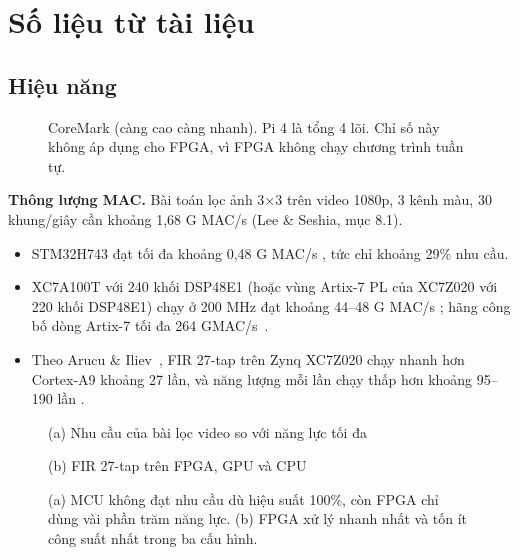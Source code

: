 \documentclass[11pt,a4paper]{article}
\begin{document}
\section{Số liệu từ tài liệu}

\subsection{Hiệu năng}

\begin{figure}[htbp]
\centering
{}
\caption{CoreMark (càng cao càng nhanh). Pi 4 là tổng 4 lõi. Chỉ số này không áp dụng cho FPGA, vì FPGA không chạy chương trình tuần tự.}
\end{figure}

\textbf{Thông lượng MAC.} Bài toán lọc ảnh 3×3 trên video 1080p, 3 kênh màu, 30 khung/giây cần khoảng 1,68 G MAC/s (Lee \& Seshia, mục 8.1).
\begin{itemize}
\item STM32H743 đạt tối đa khoảng 0,48 G MAC/s , tức chỉ khoảng 29\% nhu cầu.
\item XC7A100T với 240 khối DSP48E1 (hoặc vùng Artix-7 PL của XC7Z020 với 220 khối DSP48E1) chạy ở 200 MHz đạt khoảng 44–48 G MAC/s ; hãng công bố dòng Artix-7 tối đa 264 GMAC/s~\cite{xa7}.
\item Theo Arucu \& Iliev~\cite{arucu}, FIR 27-tap trên Zynq XC7Z020 chạy nhanh hơn Cortex-A9 khoảng 27 lần, và năng lượng mỗi lần chạy thấp hơn khoảng 95–190 lần .
\end{itemize}

\begin{figure}[htbp]
\centering
\begin{minipage}[t]{0.8\linewidth}\centering
  \small (a) Nhu cầu của bài lọc video so với năng lực tối đa
\end{minipage}\par\medskip
\begin{minipage}[t]{0.8\linewidth}\centering
  \small (b) FIR 27-tap trên FPGA, GPU và CPU
\end{minipage}
\caption{(a) MCU không đạt nhu cầu dù hiệu suất 100\%, còn FPGA chỉ dùng vài phần trăm năng lực. (b) FPGA xử lý nhanh nhất và tốn ít công suất nhất trong ba cấu hình.}
\end{figure}
\end{document}
